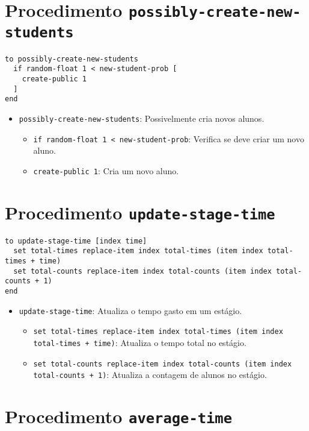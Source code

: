 \documentclass{article}
\begin{document}
\section{Procedimento \texttt{possibly-create-new-students}}

\begin{lstlisting}[language=NetLogo]
to possibly-create-new-students
  if random-float 1 < new-student-prob [
    create-public 1
  ]
end
\end{lstlisting}

\begin{itemize}
    \item \texttt{possibly-create-new-students}: Possivelmente cria novos alunos.
    \begin{itemize}
        \item \texttt{if random-float 1 < new-student-prob}: Verifica se deve criar um novo aluno.
        \item \texttt{create-public 1}: Cria um novo aluno.
    \end{itemize}
\end{itemize}

\section{Procedimento \texttt{update-stage-time}}

\begin{lstlisting}[language=NetLogo]
to update-stage-time [index time]
  set total-times replace-item index total-times (item index total-times + time)
  set total-counts replace-item index total-counts (item index total-counts + 1)
end
\end{lstlisting}

\begin{itemize}
    \item \texttt{update-stage-time}: Atualiza o tempo gasto em um estágio.
    \begin{itemize}
        \item \texttt{set total-times replace-item index total-times (item index total-times + time)}: Atualiza o tempo total no estágio.
        \item \texttt{set total-counts replace-item index total-counts (item index total-counts + 1)}: Atualiza a contagem de alunos no estágio.
    \end{itemize}
\end{itemize}

\section{Procedimento \texttt{average-time}}
\end{document}
